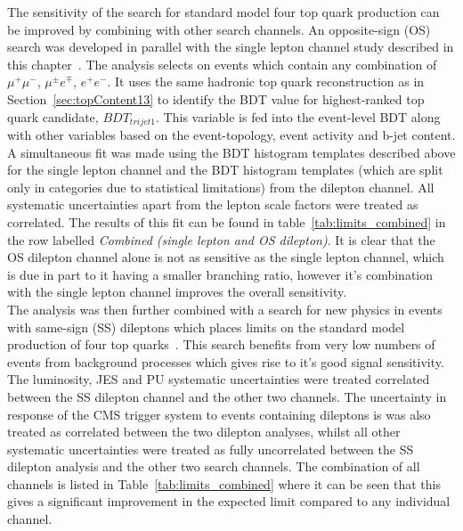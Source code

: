 The sensitivity of the search for standard model four top quark production can be improved by combining with other search channels. An opposite-sign (OS) search was developed in parallel with the single lepton channel study described in this chapter~\cite{CMS-PAS-TOP-16-016}. The analysis selects on events which contain any combination of $\mu^{+}\mu^{-}$, $\mu^{\pm} e^{\mp}$, $e^{+}e^{-}$. It uses the same hadronic top quark reconstruction as in Section~\ref{sec:topContent13} to identify the BDT value for highest-ranked top quark candidate, $BDT_{trijet1}$. This variable is fed into the event-level BDT along with other variables based on the event-topology, event activity and b-jet content. A simultaneous fit was made using the BDT histogram templates described above for the single lepton channel and the BDT histogram templates (which are split only in \njets categories due to statistical limitations) from the dilepton channel. All systematic uncertainties apart from the lepton scale factors were treated as correlated. The results of this fit can be found in table~\ref{tab:limits_combined} in the row labelled \emph{Combined (single lepton and OS dilepton)}. It is clear that the OS dilepton channel alone is not as sensitive as the single lepton channel, which is due in part to it having a smaller branching ratio, however it's combination with the single lepton channel improves the overall sensitivity.\\

The analysis was then further combined with a search for new physics in events with same-sign (SS) dileptons which places limits on the standard model production of four top quarks~\cite{Khachatryan:2016kod}. This search benefits from very low numbers of events from background processes which gives rise to it's good signal sensitivity. The luminosity, JES and PU systematic uncertainties were treated correlated between the SS dilepton channel and the other two channels. The uncertainty in response of the CMS trigger system to events containing dileptons is was also treated as correlated between the two dilepton analyses, whilst all other systematic uncertainties were treated as fully uncorrelated between the SS dilepton analysis and the other two search channels. The combination of all channels is listed in Table~\ref{tab:limits_combined} where it can be seen that this gives a significant improvement in the expected limit compared to any individual channel.

